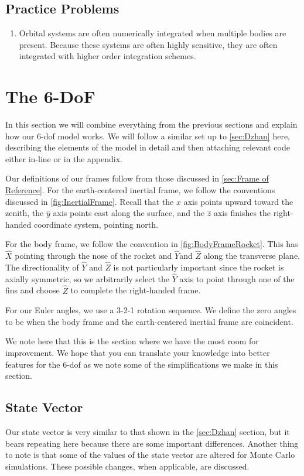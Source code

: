 \documentclass[12pt]{report}
\begin{document}
{\section{Practice Problems}

\begin{enumerate}
    \item Orbital systems are often numerically integrated when multiple bodies are present. Because these systems are often highly sensitive, they are often integrated with higher order integration schemes. 
\end{enumerate}

\chapter{The 6-DoF}
In this section we will combine everything from the previous sections and explain how our 6-\gls{dof} model works. We will follow a similar set up to \ref{sec:Dzhan}  here, describing the elements of the model in detail and then attaching relevant code either in-line or in the appendix.

Our definitions of our frames follow from those discussed in \ref{sec:Frame of Reference}. For the earth-centered inertial frame, we follow the conventions discussed in \ref{fig:InertialFrame}. Recall that the $\hat{x}$ axis points upward toward the zenith, the $\hat{y}$ axis points east along the surface, and the $\hat{z}$ axis finishes the right-handed coordinate system, pointing north.

For the body frame, we follow the convention in \ref{fig:BodyFrameRocket}. This has $\hat{X}$ pointing through the nose of the rocket and $\hat{Y}$and $\hat{Z}$ along the transverse plane. The directionality of $\hat{Y}$ and $\hat{Z}$ is not particularly important since the rocket is axially symmetric, so we arbitrarily select the $\hat{Y}$ axis to point through one of the fins and choose $\hat{Z}$ to complete the right-handed frame.

For our \gls{Euler angles}, we use a 3-2-1 rotation sequence. We define the zero angles to be when the body frame and the earth-centered inertial frame are coincident.

We note here that this is the section where we have the most room for improvement. We hope that you can translate your knowledge into better features for the 6-\gls{dof} as we note some of the simplifications we make in this section.

\section{State Vector}
Our \gls{state vector} is very similar to that shown in the \ref{sec:Dzhan} section, but it bears repeating here because there are some important differences. Another thing to note is that some of the values of the \gls{state vector} are altered for Monte Carlo simulations. These possible changes, when applicable, are discussed.

}
\end{document}
